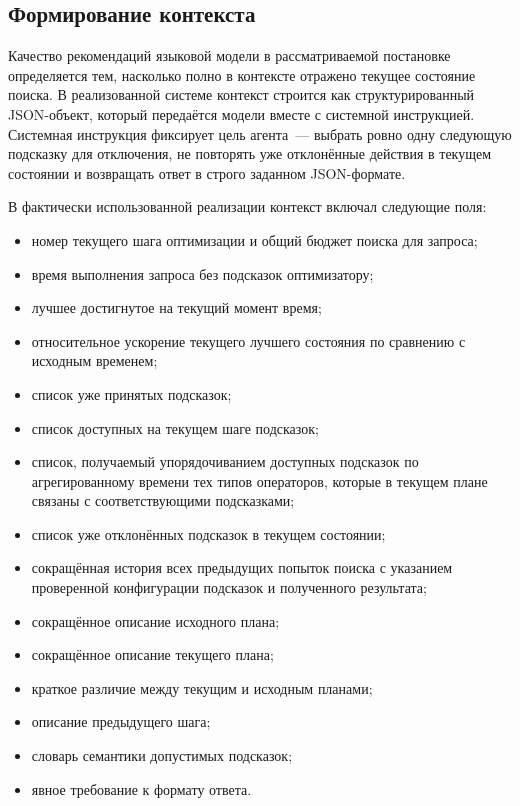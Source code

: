 \subsection{Формирование контекста}\label{subsec:ch4_context}

Качество рекомендаций языковой модели в рассматриваемой постановке определяется тем, насколько полно в контексте отражено текущее состояние поиска. В реализованной системе контекст строится как структурированный JSON-объект, который передаётся модели вместе с системной инструкцией. Системная инструкция фиксирует цель агента~--- выбрать ровно одну следующую подсказку для отключения, не повторять уже отклонённые действия в текущем состоянии и возвращать ответ в строго заданном JSON-формате.

В фактически использованной реализации контекст включал следующие поля:
\begin{itemize}
    \item номер текущего шага оптимизации и общий бюджет поиска для запроса;
    \item время выполнения запроса без подсказок оптимизатору;
    \item лучшее достигнутое на текущий момент время;
    \item относительное ускорение текущего лучшего состояния по сравнению с исходным временем;
    \item список уже принятых подсказок;
    \item список доступных на текущем шаге подсказок;
    \item список, получаемый упорядочиванием доступных подсказок по агрегированному времени тех типов операторов, которые в текущем плане связаны с соответствующими подсказками;
    \item список уже отклонённых подсказок в текущем состоянии;
    \item сокращённая история всех предыдущих попыток поиска с указанием
    проверенной конфигурации подсказок и полученного результата;
    \item сокращённое описание исходного плана;
    \item сокращённое описание текущего плана;
    \item краткое различие между текущим и исходным планами;
    \item описание предыдущего шага;
    \item словарь семантики допустимых подсказок;
    \item явное требование к формату ответа.
\end{itemize}

